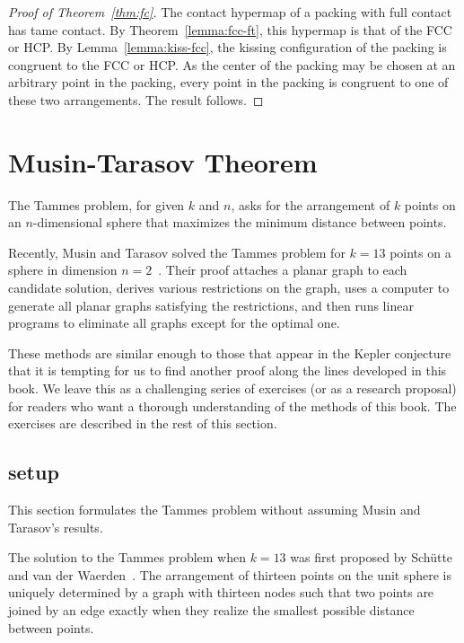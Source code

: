 \begin{proof}[Proof of Theorem~\ref{thm:fc}]  %
  The contact hypermap of a packing with full contact has tame
  contact.  By Theorem~\ref{lemma:fcc-ft}, this hypermap is that of
  the FCC or HCP.  By Lemma~\ref{lemma:kiss-fcc}, the kissing
  configuration of the packing is congruent to the FCC or HCP.  As the
  center of the packing may be chosen at an arbitrary point in the
  packing, every point in the packing is congruent to one of these two
  arrangements.  The result follows.
\end{proof}



\section{Musin-Tarasov Theorem}

The Tammes problem, for given $k$ and $n$, asks for the arrangement of
$k$ points on an $n$-dimensional sphere that maximizes the minimum
distance between points.

Recently, Musin and Tarasov solved the Tammes problem for $k=13$
points on a sphere in dimension $n=2$~\cite{Musin-Tarasov}.  Their
proof attaches a planar graph to each candidate solution, derives
various restrictions on the graph, uses a computer to generate all
planar graphs satisfying the restrictions, and then runs linear programs
to eliminate all graphs except for the optimal one.

These methods are similar enough to those that appear in the Kepler
conjecture that it is tempting for us to find another proof along the
lines developed in this book.  We leave this as a challenging series
of exercises (or as a research proposal) for readers who want a
thorough understanding of the methods of this book.  The exercises are
described in the rest of this section.

\subsection{setup}

This section formulates the Tammes problem without assuming 
 Musin and Tarasov's results.

The solution to the Tammes problem when $k=13$ was first proposed by
Sch\"utte and van der Waerden~\cite{vanderWaerden:1951}.  The arrangement of thirteen
points on the unit sphere is uniquely determined by a graph with thirteen
nodes such that two points are joined by an edge exactly when they
realize the smallest possible distance between points.

